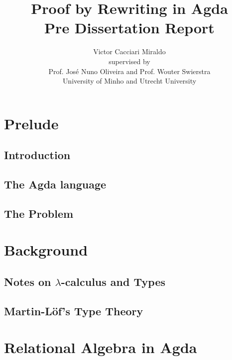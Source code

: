 \documentclass{report}
\title{Proof by Rewriting in Agda\\ \small{Pre Dissertation Report}}
\author{Victor Cacciari Miraldo\\[2cm] %
\small{supervised by} \\
Prof. José Nuno Oliveira and Prof. Wouter Swierstra \\
University of Minho and Utrecht University}
\begin{document}
\maketitle
\tableofcontents



\chapter{Prelude}
\label{chap:prelude}

  \section{Introduction}
  \label{sec:prelude:introduction}
  
  
  \section{The Agda language}
  \label{sec:prelude:agdalanguage}
  
  
  \section{The Problem}
  \label{sec:prelude:theproblem}
  
  
\chapter{Background}
\label{chap:background}


  \section{Notes on $\lambda$-calculus and Types}
  \label{sec:background:lambdacalculus}
  
  
  \section{Martin-Löf's Type Theory}
  \label{sec:background:martinlof}
  
  
\chapter{Relational Algebra in Agda}
\label{chap:relationalalgebrainagda}

\end{document}
